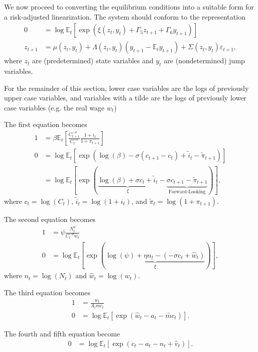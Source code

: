 \documentclass[12 pt, oneside]{article}
\theoremstyle{definition}
\theoremstyle{definition}
\theoremstyle{definition}
\newcommand{\E}{\mathbb{E}}
\newcommand{\fd}{\vspace{2.5mm}}
\begin{document}
We now proceed to converting the equilibrium conditions into a suitable form for a risk-adjusted linearization. The system should conform to the representation
\begin{align*}
  0 & = \log \E_t\left[\exp\left(\xi(z_t, y_t) + \Gamma_5 z_{t + 1} + \Gamma_6 y_{t + 1}\right)\right]\\
  z_{t + 1} & = \mu(z_t, y_t) + \Lambda(z_t, y_t) (y_{t + 1} - \E_t y_{t + 1}) + \Sigma(z_t, y_t) \varepsilon_{t + 1},
\end{align*}
where $z_t$ are (predetermined) state variables and $y_t$ are (nondetermined) jump variables.

For the remainder of this section, lower case variables are the logs of previously upper case variables, and variables with a tilde are the logs of previously lower case variables (e.g. the real wage $w_t$)

\fd

The first equation becomes
\begin{align*}
  1 & = \beta \E_t\left[\frac{C_{t + 1}^{-\sigma}}{C_t^{-\sigma}}\frac{ 1 + i_t}{1 + \pi_{t + 1}}\right]\\
  0 & = \log\E_t\left[\exp\left(\log(\beta) -\sigma (c_{t + 1} - c_t) + \tilde{i}_t - \tilde{\pi}_{t + 1} \right)\right]\\
    & = \log\E_t\left[\exp\left(\underbrace{\log(\beta) + \sigma c_t + \tilde{i}_t}_{\xi} - \underbrace{\sigma c_{t + 1} - \tilde{\pi}_{t + 1}}_{\text{Forward-Looking}} \right)\right],
\end{align*}
where $c_t = \log(C_t)$, $\tilde{i}_t = \log(1 + i_t)$, and $\tilde{\pi}_t = \log(1 + \pi_{t + 1})$.

\fd

The second equation becomes
\begin{align*}
  1 & = \psi\frac{N_t^\eta}{C_t^{-\sigma} w_t}\\
  0 & = \log \E_t\left[\exp\left(\underbrace{\log(\psi) + \eta n_t - (- \sigma c_t + \hat{w}_t)}_{\xi}\right)\right],
\end{align*}
where $n_t = \log(N_t)$ and $\hat{w}_t = \log(w_t)$.

\fd

The third equation becomes
\begin{align*}
  1 & = \frac{w_t}{A_t mc_t}\\
  0 & = \log\E_t\left[\exp\left(\hat{w}_t - a_t - \tilde{mc}_t \right)\right].
\end{align*}

The fourth and fifth equation become
\begin{align*}
  0 & = \log\E_t\left[\exp\left(c_t - a_t - n_t + \hat{v}_t \right)\right].
\end{align*}
\end{document}
